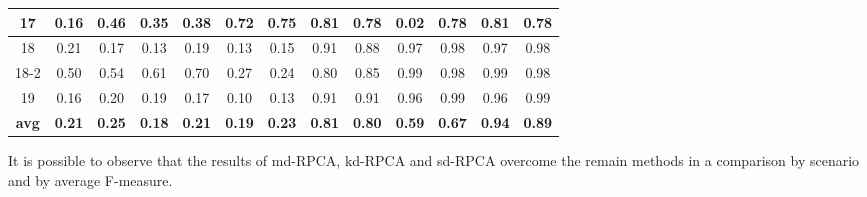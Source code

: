 \begin{table}[h!]
\begin{tabular}{ c|c c|c c|c c|c c|c c|c c }
		17 & 0.16 & 0.46 & 0.35 & 0.38 & 0.72 & 0.75 & 0.81 & 0.78 & 0.02 & 0.78 & 0.81 & 0.78 \\ \hline
		18 & 0.21 & 0.17 & 0.13 & 0.19 & 0.13 & 0.15 & 0.91 & 0.88 & 0.97 & 0.98 & 0.97 & 0.98 \\ \hline
		18-2 & 0.50 & 0.54 & 0.61 & 0.70 & 0.27 & 0.24 & 0.80 & 0.85 & 0.99 & 0.98 & 0.99 & 0.98 \\ \hline
		19 & 0.16 & 0.20 & 0.19 & 0.17 & 0.10 & 0.13 & 0.91 & 0.91 & 0.96 & 0.99 & 0.96 & 0.99 \\ \hline
		\rowcolor{Gray} \textbf{avg} &\textbf{0.21} &\textbf{0.25} &\textbf{0.18} & \textbf{0.21} & \textbf{0.19} &\textbf{0.23} &\textbf{0.81} &\textbf{0.80} &\textbf{0.59} &\textbf{0.67} &\textbf{0.94} &\textbf{0.89} \\
    \bottomrule
  \end{tabular}
\end{table}

It is possible to observe that the results of md-RPCA, kd-RPCA and sd-RPCA overcome the remain methods in a comparison by scenario and by average F-measure. 



